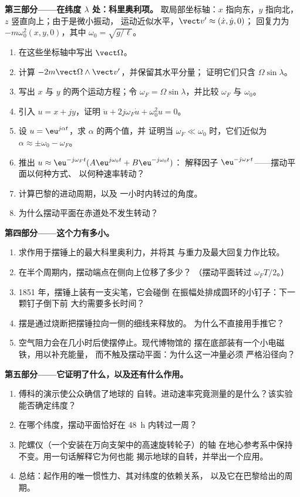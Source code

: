 \begin{problem}
\medskip
\noindent\textbf{第三部分——在纬度 $\lambda$ 处：科里奥利项。}
取局部坐标轴：$x$ 指向东，$y$ 指向北，$z$ 竖直向上；由于是微小振动，
运动近似水平，$\vect v' \approx (\dot x, \dot y, 0)$；
回复力为 $-m\omega_0^2(x, y, 0)$，其中 $\omega_0 = \sqrt{g/\ell}$。
\begin{enumerate}[resume]
  \item 在这些坐标轴中写出 $\vect\Omega$。
  \item 计算 $-2m\vect\Omega\wedge\vect v'$，并保留其水平分量；
        证明它们只含 $\Omega\sin\lambda$。
  \item 写出 $x$ 与 $y$ 的两个运动方程；令
        $\omega_F = \Omega\sin\lambda$，并比较 $\omega_F$ 与 $\omega_0$。
  \item 引入 $u = x + jy$，证明 $\ddot u + 2j\omega_F\dot u +
        \omega_0^2u = 0$。
  \item 设 $u = \eu^{j\alpha t}$，求 $\alpha$ 的两个值，并
        证明当 $\omega_F \ll \omega_0$ 时，它们近似为 $\alpha \approx \pm\omega_0
        - \omega_F$。
  \item 推出 $u \approx \eu^{-j\omega_Ft}(A\eu^{j\omega_0t} + B\eu^{-j\omega_0t})$：
        解释因子 $\eu^{-j\omega_Ft}$——摆动平面以何种方式、
        以何种速率转动？
  \item 计算巴黎的进动周期，以及
        一小时内转过的角度。
  \item 为什么摆动平面在赤道处不发生转动？
\end{enumerate}

\medskip
\noindent\textbf{第四部分——这个力有多小。}
\begin{enumerate}[resume]
  \item 求作用于摆锤上的最大科里奥利力，并将其
        与重力及最大回复力作比较。
  \item 在半个周期内，摆动端点在侧向上位移了多少？
        （摆动平面转过 $\omega_FT/2$。）
  \item 1851 年，摆锤上装有一支尖笔，它会碰倒
        在振幅处排成圆环的小钉子：下一颗钉子倒下前
        大约需要多长时间？
  \item 摆是通过烧断把摆锤拉向一侧的细线来释放的。
        为什么不直接用手推它？
  \item 空气阻力会在几小时后使摆停止。现代博物馆的
        摆在底部装有一个小电磁铁，用以补充能量，
        而不触及摆动平面：为什么这一冲量必须
        严格沿径向？
\end{enumerate}

\medskip
\noindent\textbf{第五部分——它证明了什么，以及还有什么作用。}
\begin{enumerate}[resume]
  \item 傅科的演示使公众确信了地球的
        自转。进动速率究竟测量的是什么？该实验
        能否确定纬度？
  \item 在哪个纬度，摆动平面恰好在 \qty{48}{h} 内转过一周？
  \item 陀螺仪（一个安装在万向支架中的高速旋转轮子）的轴
        在地心参考系中保持不变。用一句话解释它为何也能
        揭示地球的自转，并举出一个应用。
  \item 总结：起作用的唯一惯性力、其对纬度的依赖关系，
        以及它在巴黎给出的周期。
\end{enumerate}
\end{problem}
